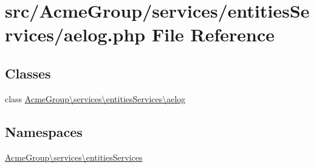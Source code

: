 \hypertarget{services_2entities_services_2aelog_8php}{\section{src/\+Acme\+Group/services/entities\+Services/aelog.php File Reference}
\label{services_2entities_services_2aelog_8php}
}
\subsection*{Classes}
\begin{DoxyCompactItemize}
\item 
class \hyperlink{class_acme_group_1_1services_1_1entities_services_1_1aelog}{Acme\+Group\textbackslash{}services\textbackslash{}entities\+Services\textbackslash{}aelog}
\end{DoxyCompactItemize}
\subsection*{Namespaces}
\begin{DoxyCompactItemize}
\item 
 \hyperlink{namespace_acme_group_1_1services_1_1entities_services}{Acme\+Group\textbackslash{}services\textbackslash{}entities\+Services}
\end{DoxyCompactItemize}

